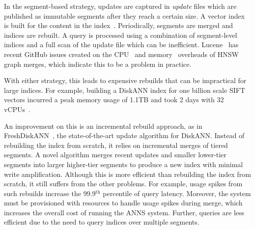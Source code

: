 In the segment-based strategy, updates are captured in \emph{update} files which are published
as immutable segments after they reach a certain size. 
A vector index is built for the content in the index~\cite{Lucene-vector}.
Periodically, segments are merged and indices are rebuilt.
A query is processed using a combination of segment-level indices and a full scan of the update file which can be inefficient. Lucene~\cite{Lucene} has recent GitHub issues created on the CPU~\cite{lucene-hnsw-cpu} and memory~\cite{lucene-hnsw-memory} overheads of HNSW~\cite{HNSW16} graph merges, which indicate this to be a problem in practice.



With either strategy, this leads to expensive rebuilds that can be impractical for large indices.
For example, building a DiskANN index for one  billion scale SIFT vectors incurred a peak
memory usage of 1.1TB and took 2 days with 32 vCPUs~\cite{DiskANN19}.


An improvement on this is an incremental rebuild approach, as in FreshDiskANN~\cite{freshdiskann},
the state-of-the-art update algorithm for DiskANN.
Instead of rebuilding the index from scratch, it relies on incremental merges of tiered segments.
A novel algorithm merges  recent updates and smaller lower-tier segments into larger higher-tier segments
to produce a new index with minimal write amplification.
Although this is more efficient than rebuilding the index from scratch,
it still suffers from the other problems.
For example, usage spikes from such rebuilds increase the 99.9$^\textrm{th}$ percentile of query latency.
Moreover, the system must be provisioned with resources to handle usage spikes during merge,
which increases the overall cost of running the ANNS system. 
Further, queries are less efficient due to the need to query indices over multiple segments.



